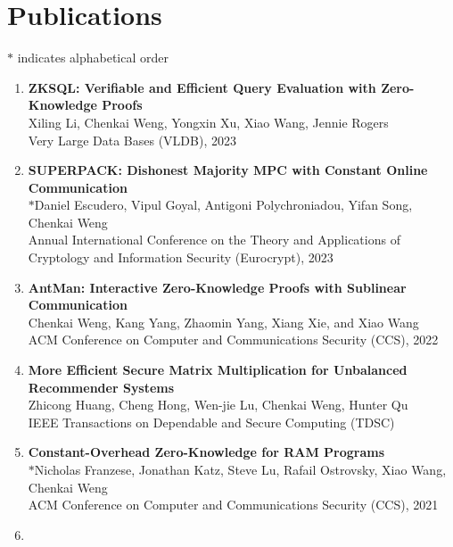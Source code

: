 \documentclass[letterpaper,11pt]{article}
\newcommand{\resumeSubHeadingListStart}{\begin{itemize}[leftmargin=0.15in, label={}]}
\begin{document}
\section{Publications}
{\small $\ast$ indicates alphabetical order}
\begin{enumerate}[leftmargin=0.20in]
  \item
    {\textbf{\small ZKSQL: Verifiable and Efficient Query Evaluation with Zero-Knowledge Proofs}} \\
		{\small Xiling Li, Chenkai Weng, Yongxin Xu, Xiao Wang, Jennie Rogers \vspace{-2pt}} \\
    {\small Very Large Data Bases (VLDB), 2023}
  \item
    {\textbf{\small SUPERPACK: Dishonest Majority MPC with Constant Online Communication}} \\
		$\ast${\small Daniel Escudero, Vipul Goyal, Antigoni Polychroniadou, Yifan Song, Chenkai Weng \vspace{-2pt}} \\
    {\small Annual International Conference on the Theory and Applications of Cryptology and Information Security (Eurocrypt), 2023}
  \item
    {\textbf{\small AntMan: Interactive Zero-Knowledge Proofs with Sublinear Communication}} \\
		{\small Chenkai Weng, Kang Yang, Zhaomin Yang, Xiang Xie, and Xiao Wang \vspace{-2pt}} \\
		{\small ACM Conference on Computer and Communications Security (CCS), 2022}
  \item
    {\textbf{\small More Efficient Secure Matrix Multiplication for Unbalanced Recommender Systems}} \\
		{\small Zhicong Huang, Cheng Hong, Wen-jie Lu, Chenkai Weng, Hunter Qu \vspace{-2pt}} \\
		{\small IEEE Transactions on Dependable and Secure Computing (TDSC)}
  \item
    {\textbf{\small Constant-Overhead Zero-Knowledge for RAM Programs}} \\
		$\ast${\small Nicholas Franzese, Jonathan Katz, Steve Lu, Rafail Ostrovsky, Xiao Wang, Chenkai Weng \vspace{-2pt}} \\
		{\small ACM Conference on Computer and Communications Security (CCS), 2021}
  \item

\end{enumerate}
\end{document}
